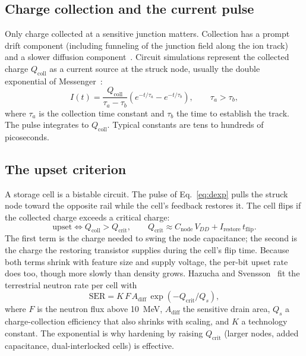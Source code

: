 \documentclass[11pt,a4paper]{article}
\begin{document}
\subsection{Charge collection and the current pulse}

Only charge collected at a sensitive junction matters. Collection has a prompt drift component (including funneling of the junction field along the ion track) and a slower diffusion component~\cite{dodd2003}. Circuit simulations represent the collected charge $Q_{\mathrm{coll}}$ as a current source at the struck node, usually the double exponential of Messenger~\cite{messenger1982}:
\begin{equation}
I(t) = \frac{Q_{\mathrm{coll}}}{\tau_{a} - \tau_{b}} \left( e^{-t/\tau_{a}} - e^{-t/\tau_{b}} \right), \qquad \tau_a > \tau_b,
\label{eq:dexp}
\end{equation}
where $\tau_a$ is the collection time constant and $\tau_b$ the time to establish the track. The pulse integrates to $Q_{\mathrm{coll}}$. Typical constants are tens to hundreds of picoseconds.

\subsection{The upset criterion}

A storage cell is a bistable circuit. The pulse of Eq.~\eqref{eq:dexp} pulls the struck node toward the opposite rail while the cell's feedback restores it. The cell flips if the collected charge exceeds a critical charge:
\begin{equation}
\text{upset} \iff Q_{\mathrm{coll}} > Q_{\mathrm{crit}}, \qquad Q_{\mathrm{crit}} \approx C_{\mathrm{node}}\, V_{DD} + I_{\mathrm{restore}}\, t_{\mathrm{flip}}.
\label{eq:qcrit}
\end{equation}
The first term is the charge needed to swing the node capacitance; the second is the charge the restoring transistor supplies during the cell's flip time. Because both terms shrink with feature size and supply voltage, the per-bit upset rate does too, though more slowly than density grows. Hazucha and Svensson~\cite{hazucha2000} fit the terrestrial neutron rate per cell with
\begin{equation}
\mathrm{SER} = K\, F\, A_{\mathrm{diff}}\, \exp\left( -Q_{\mathrm{crit}}/Q_s \right),
\label{eq:hazucha}
\end{equation}
where $F$ is the neutron flux above 10~MeV, $A_{\mathrm{diff}}$ the sensitive drain area, $Q_s$ a charge-collection efficiency that also shrinks with scaling, and $K$ a technology constant. The exponential is why hardening by raising $Q_{\mathrm{crit}}$ (larger nodes, added capacitance, dual-interlocked cells) is effective.
\end{document}

